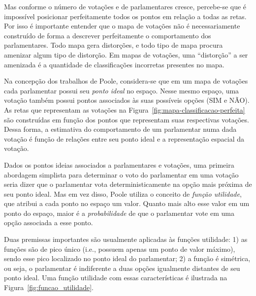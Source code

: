 \documentclass[
	article,			%
	12pt,				%
	oneside,			%
	a4paper,			%
	english,			%
	brazil,				%
	sumario=tradicional,
	oldfontcommands %
	]{abntex2}
\newcommand\nay{NÃO\xspace}
\newcommand\yea{SIM\xspace}
\begin{document}
Mas conforme o número de votações e de parlamentares cresce, percebe-se que é impossível posicionar perfeitamente todos os pontos em relação a todas as retas. Por isso é importante entender que o mapa de votações não é necessariamente construído de forma a descrever perfeitamente o comportamento dos parlamentares. Todo mapa gera distorções, e todo tipo de mapa procura amenizar algum tipo de distorção. Em mapas de votações, uma ``distorção'' a ser amenizada é a quantidade de classificações incorretas presentes no mapa.

Na concepção dos trabalhos de Poole, considera-se que em um mapa de votações cada parlamentar possui seu \emph{ponto ideal} no espaço. Nesse mesmo espaço, uma votação também possui pontos associados às suas possíveis opções (\yea e \nay). As retas que representam as votações na Figura~\ref{fig:mapa-classificacao-perfeita} são construídas em função dos pontos que representam suas respectivas votações. Dessa forma, a estimativa do comportamento de um parlamentar numa dada votação é função de relações entre seu ponto ideal e a representação espacial da votação. 

Dados os pontos ideias associados a parlamentares e votações, uma primeira abordagem simplista para determinar o voto do parlamentar em uma votação seria dizer que o parlamentar vota deterministicamente na opção mais próxima de seu ponto ideal. Mas em vez disso, Poole utiliza o conceito de \emph{função utilidade}, que atribui a cada ponto no espaço um valor. Quanto mais alto esse valor em um ponto do espaço, maior é a \emph{probabilidade} de que o parlamentar vote em uma opção associada a esse ponto.

Duas premissas importantes são usualmente aplicadas às funções utilidade: 1) as funções são de pico único (i.e., possuem apenas um ponto de valor máximo), sendo esse pico localizado no ponto ideal do parlamentar; 2) a função é simétrica, ou seja, o parlamentar é indiferente a duas opções igualmente distantes de seu ponto ideal. Uma função utilidade com essas características é ilustrada na Figura~\ref{fig:funcao_utilidade}.
\end{document}
